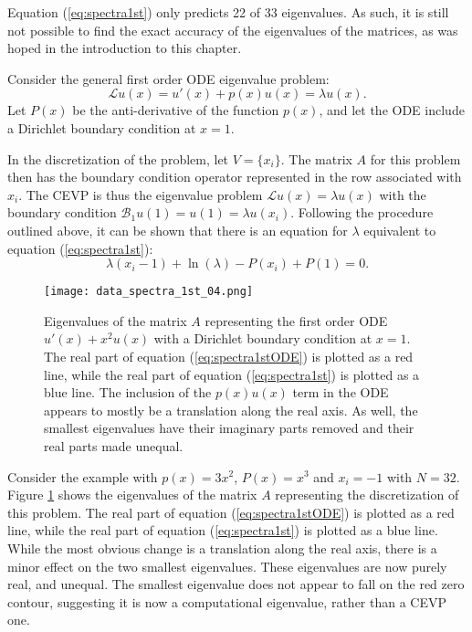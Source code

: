 \documentclass{sfuthesis}
\begin{document}
Equation (\ref{eq:spectra1st}) only predicts 22 of 33 eigenvalues.
As such, it is still not possible to find the exact accuracy of the eigenvalues of the matrices, as was hoped in the introduction to this chapter.

Consider the general first order ODE eigenvalue problem:
\begin{equation}
\mathcal{L} u(x) = u'(x) + p(x) u(x) = \lambda u(x).
\end{equation}
Let $P(x)$ be the anti-derivative of the function $p(x)$, and let the ODE include a Dirichlet boundary condition at $x=1$.

In the discretization of the problem, let $V = \{x_i\}$.
The matrix $A$ for this problem then has the boundary condition operator represented in the row associated with $x_i$.
The CEVP is thus the eigenvalue problem $\mathcal{L} u(x) = \lambda u(x)$ with the boundary condition $\mathcal{B}_1 u(1) = u(1) = \lambda u(x_i)$.
Following the procedure outlined above, it can be shown that there is an equation for $\lambda$ equivalent to equation (\ref{eq:spectra1st}):
\begin{equation} \label{eq:spectra1stODE}
\lambda (x_i - 1) + \ln(\lambda) - P(x_i) + P(1) = 0.
\end{equation}

\begin{figure}
\texttt{[image: data\_spectra\_1st\_04.png]}
\caption{Eigenvalues of the matrix $A$ representing the first order ODE $u'(x) + x^2 u(x)$ with a Dirichlet boundary condition at $x=1$.
The real part of equation (\ref{eq:spectra1stODE}) is plotted as a red line, while the real part of equation (\ref{eq:spectra1st}) is plotted as a blue line.
The inclusion of the $p(x) u(x)$ term in the ODE appears to mostly be a translation along the real axis.
As well, the smallest eigenvalues have their imaginary parts removed and their real parts made unequal.}
\label{fig:Spectra1st_04}
\end{figure}

Consider the example with $p(x) = 3 x^2$, $P(x) = x^3$ and $x_i = -1$ with $N = 32$.
Figure \ref{fig:Spectra1st_04} shows the eigenvalues of the matrix $A$ representing the discretization of this problem.
The real part of equation (\ref{eq:spectra1stODE}) is plotted as a red line, while the real part of equation (\ref{eq:spectra1st}) is plotted as a blue line.
While the most obvious change is a translation along the real axis, there is a minor effect on the two smallest eigenvalues.
These eigenvalues are now purely real, and unequal.
The smallest eigenvalue does not appear to fall on the red zero contour, suggesting it is now a computational eigenvalue, rather than a CEVP one.
\end{document}
